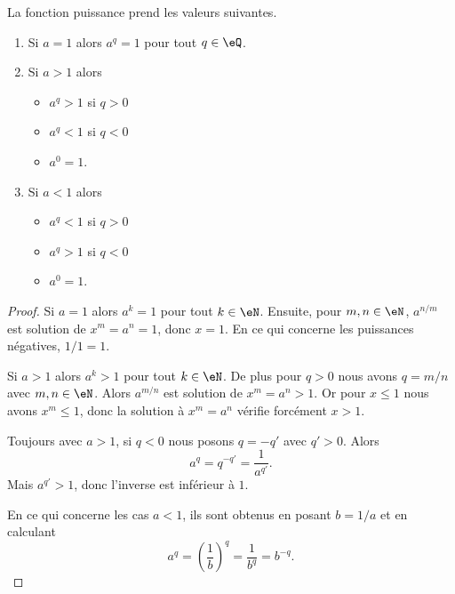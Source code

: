 \begin{lemma}        \label{LEMooXJXUooLoiTMo}
    La fonction puissance prend les valeurs suivantes.
    \begin{enumerate}
        \item
            Si \( a=1\) alors \( a^q=1\) pour tout \( q\in \eQ\).
        \item       \label{ITEMooKZCGooKskUQx}
            Si \( a>1\) alors 
            \begin{itemize}
                \item \( a^q>1\) si \( q>0\)
                \item \( a^q<1\) si \( q<0\)
                \item \( a^0=1\).
            \end{itemize}
        \item
            Si \( a<1\) alors 
            \begin{itemize}
                \item \( a^q<1\) si \( q>0\)
                \item \( a^q>1\) si \( q<0\)
                \item \( a^0=1\).
            \end{itemize}
    \end{enumerate}
\end{lemma}

\begin{proof}
    Si \( a=1\) alors \( a^k=1\) pour tout \( k\in \eN\). Ensuite, pour \( m,n\in \eN\), \( a^{n/m}\) est solution de \( x^m=a^n=1\), donc \( x=1\). En ce qui concerne les puissances négatives, \( 1/1=1\).

    Si \( a>1\) alors \( a^k>1\) pour tout \( k\in \eN\). De plus pour \( q>0\) nous avons \( q=m/n\) avec \( m,n\in \eN\). Alors \( a^{m/n}\) est solution de \( x^m=a^n>1\). Or pour \( x\leq 1\) nous avons \( x^m\leq 1\), donc la solution à \( x^m=a^n\) vérifie forcément \( x>1\).

    Toujours avec \( a>1\), si \( q<0\) nous posons \( q=-q'\) avec \( q'>0\). Alors
    \begin{equation}
        a^q=q^{-q'}=\frac{1}{ a^{q'} }.
    \end{equation}
    Mais \( a^{q'}>1\), donc l'inverse est inférieur à \( 1\).

    En ce qui concerne les cas \( a<1\), ils sont obtenus en posant \( b=1/a\) et en calculant
    \begin{equation}
        a^q=\left( \frac{1}{ b } \right)^q=\frac{1}{ b^q }=b^{-q}.
    \end{equation}
\end{proof}

